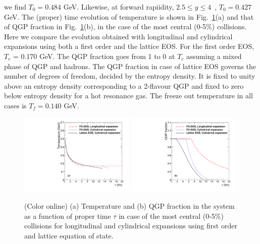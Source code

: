 \documentclass[review]{elsarticle}
\begin{document}
{{    we find $T_0 = 0.484$ GeV.  Likewise, at forward rapiidity, $2.5 \leq y \leq 4$~\cite{Abbas:2013bpa}, 
    $T_0 = 0.427$ GeV.}
  The (proper) time evolution of temperature is shown in Fig.~\ref{fig:TauVsTemp}(a) 
  and that of QGP fraction in Fig.~\ref{fig:TauVsTemp}(b), in the case of the most central (0-5$\%$) collisions.
  Here we compare the evolution obtained with longitudinal and cylindrical expansions using 
  both a first order and the lattice EOS. 
  For the first order EOS, $T_c$ = 0.170 GeV. The QGP fraction goes from 1 to 0 at $T_c$ 
  assuming a mixed phase of QGP and hadrons. The QGP fraction in case of lattice EOS governs the 
  number of degrees of freedom, decided by the entropy density. It is fixed to unity above an entropy density 
  corresponding to a 2-flavour QGP and fixed to zero below entropy density for a hot 
  resonance gas. The freeze out temperature in all cases is $T_f=0.140$ GeV.  
  
  \begin{figure}
    \includegraphics[width=0.49\textwidth]{Figures/Quarkonia_276TeV/Fig1a_TauVsTemp.pdf}
    \includegraphics[width=0.49\textwidth]{Figures/Quarkonia_276TeV/Fig1b_TauVsFQGP.pdf}
    \caption{(Color online) (a) Temperature and (b) QGP fraction in the system as a function of proper 
      time $\tau$ in case of the most central (0-5$\%$) collisions for longitudinal and cylindrical expansions 
      using first order and lattice equation of state.}
    \label{fig:TauVsTemp}
  \end{figure}
}
\end{document}
